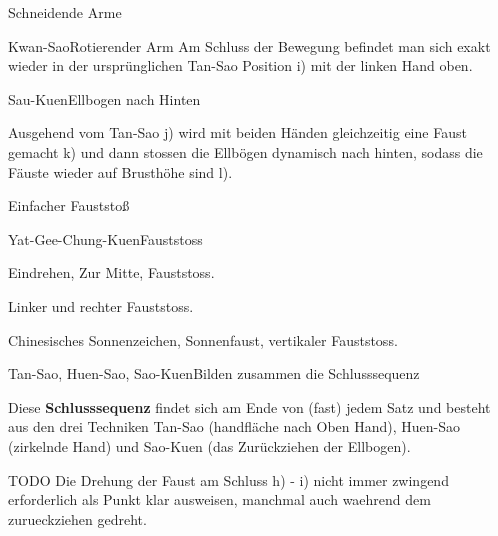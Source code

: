 \begin{WTSatz}{Schneidende Arme}
\begin{WTSatzTeil}{Kwan-Sao}{Rotierender Arm}
		Am Schluss der Bewegung befindet man sich exakt wieder in der urspr\"unglichen Tan-Sao Position i) mit der linken Hand oben.
		
	\end{WTSatzTeil}
	
	\begin{WTSatzTeil}{Sau-Kuen}{Ellbogen nach Hinten}
		
		Ausgehend vom Tan-Sao j) wird mit beiden H\"anden gleichzeitig eine Faust gemacht k) und dann stossen die Ellb\"ogen dynamisch nach hinten, sodass die F\"auste wieder auf Brusth\"ohe sind l).
	\end{WTSatzTeil}
	

\end{WTSatz}



\begin{WTSatz}{Einfacher Fauststo{\ss}}%
	\begin{WTSatzTeil}{Yat-Gee-Chung-Kuen}{Fauststoss}
		
		Eindrehen, Zur Mitte, Fauststoss.
		
		Linker und rechter Fauststoss.
		
		Chinesisches Sonnenzeichen, Sonnenfaust, vertikaler Fauststoss.
	\end{WTSatzTeil}
	\begin{WTSatzTeil}{Tan-Sao, Huen-Sao, Sao-Kuen}{Bilden zusammen die Schlusssequenz}
		
		
		Diese \textbf{Schlusssequenz} findet sich am Ende von (fast) jedem Satz und besteht aus den drei Techniken Tan-Sao (handfl\"ache nach Oben Hand), Huen-Sao (zirkelnde Hand) und Sao-Kuen (das Zur\"uckziehen der Ellbogen).
		
		TODO Die Drehung der Faust am Schluss h) - i) nicht immer zwingend erforderlich als Punkt klar ausweisen, manchmal auch waehrend dem zurueckziehen gedreht.
	\end{WTSatzTeil}
\end{WTSatz}

